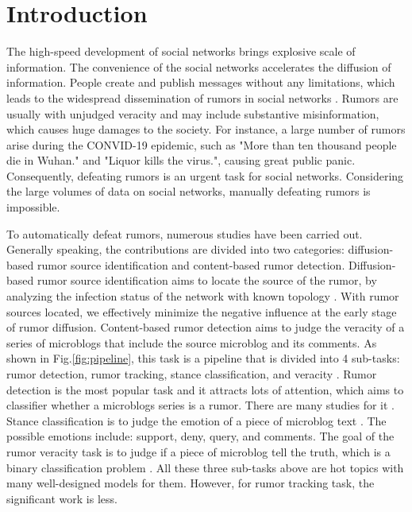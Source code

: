 \section{Introduction}
\label{sec:introduction}
The high-speed development of social networks brings explosive scale of information. The convenience of the social networks accelerates the diffusion of information. People create and publish messages without any limitations, which leads to the widespread dissemination of rumors in social networks \cite{DBLP:journals/corr/KurkaGZ15, DBLP:journals/csur/ZubiagaABLP18, DBLP:conf/sirocco/KostkaOW08, vosoughi2018spread}. Rumors are usually with unjudged veracity and may include substantive misinformation, which causes huge damages to the society. For instance, a large number of rumors arise during the CONVID-19 epidemic, such as "More than ten thousand people die in Wuhan." and "Liquor kills the virus.", causing great public panic. Consequently, defeating rumors is an urgent task for social networks. Considering the large volumes of data on social networks, manually defeating rumors is impossible. 

To automatically defeat rumors, numerous studies have been carried out. Generally speaking, the contributions are divided into two categories:  diffusion-based rumor source identification and content-based rumor detection. Diffusion-based rumor source identification aims to locate the source of the rumor, by analyzing the infection status of the network with known topology \cite{DBLP:conf/sigmetrics/ShahZ10, DBLP:journals/tit/ShahZ11, DBLP:conf/kdd/LappasTGM10}. With rumor sources located, we effectively minimize the negative influence at the early stage of rumor diffusion. Content-based rumor detection aims to judge the veracity of a series of microblogs that include the source microblog and its comments. As shown in Fig.\ref{fig:pipeline}, this task is a pipeline that is divided into 4 sub-tasks: rumor detection, rumor tracking, stance classification, and veracity \cite{DBLP:journals/csur/ZubiagaABLP18, DBLP:conf/coling/KochkinaLZ18}. Rumor detection is the most popular task and it attracts lots of attention, which aims to classifier whether a microblogs series is a rumor. There are many studies for it \cite{DBLP:conf/socinfo/ZubiagaLP17, DBLP:conf/www/Ma0W19,DBLP:conf/naacl/NguyenDCD19, DBLP:journals/corr/abs-1906-05659}. Stance classification is to judge the emotion of a piece of microblog text \cite{DBLP:conf/semeval/EnayetE17, DBLP:conf/semeval/X17a, DBLP:conf/coling/ZubiagaKLPL16}. The possible emotions include: support, deny, query, and comments. The goal of the rumor veracity task is to judge if a piece of microblog tell the truth, which is a binary classification problem \cite{DBLP:conf/coling/KochkinaLZ18, DBLP:conf/acl/LiZS19, DBLP:conf/acl/KumarC19}. All these three sub-tasks above are hot topics with many well-designed models for them. However, for rumor tracking task, the significant work is less.

